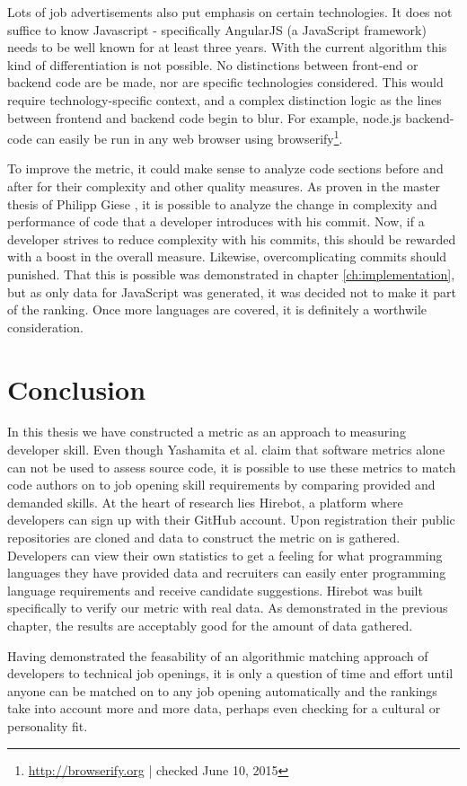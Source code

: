 Lots of job advertisements also put emphasis on certain technologies.
It does not suffice to know Javascript - specifically AngularJS (a JavaScript framework)
needs to be well known for at least three years.
With the current algorithm this kind of differentiation is not possible.
No distinctions between front-end or backend code are be made,
nor are specific technologies considered. This would require technology-specific
context, and a complex distinction logic as the lines between frontend
and backend code begin to blur. For example, node.js backend-code
can easily be run in any web browser using browserify\footnote{\url{http://browserify.org} | checked June 10, 2015}.
\newline

To improve the metric, it could make sense to analyze code sections
before and after for their complexity and other quality measures.
As proven in the master thesis of Philipp Giese \cite{pg:2014},
it is possible to analyze the change in complexity and performance
of code that a developer introduces with his commit.
Now, if a developer strives to reduce complexity with his commits,
this should be rewarded with a boost in the overall measure.
Likewise, overcomplicating commits should punished.
That this is possible was demonstrated in chapter \ref{ch:implementation},
but as only data for JavaScript was generated, it was decided not to make
it part of the ranking. Once more languages are covered, it is definitely
a worthwile consideration.

\section{Conclusion}
In this thesis we have constructed a metric as an approach to measuring developer
skill. Even though Yashamita et al. claim that software metrics alone can not
be used to assess source code\cite{mlya:2012}, it is possible to use these metrics
to match code authors on to job opening skill requirements by comparing provided and demanded skills.
At the heart of research lies Hirebot, a platform where developers can sign up with their
GitHub account. Upon registration their public repositories are cloned and
data to construct the metric on is gathered.
Developers can view their own statistics to get a feeling for what programming
languages they have provided data and recruiters can easily
enter programming language requirements and receive candidate suggestions.
Hirebot was built specifically to verify our metric with real data.
As demonstrated in the previous chapter, the results are acceptably good for
the amount of data gathered.

Having demonstrated the feasability of an algorithmic matching approach
of developers to technical job openings, it is only a question of time and effort
until anyone can be matched on to any job opening automatically and the rankings
take into account more and more data, perhaps even checking for a cultural or
personality fit.